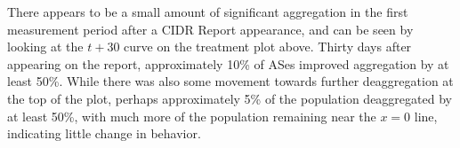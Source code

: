 There appears to be a small amount of significant aggregation in
the first measurement period after a CIDR Report appearance, and can be seen
by looking at the $t+30$ curve on the treatment plot above. Thirty days after
appearing on the report, approximately 10\% of ASes improved aggregation by at
least 50\%. While there was also some movement towards further deaggregation at
the top of the plot, perhaps approximately 5\% of the population deaggregated
by at least 50\%, with much more of the population remaining near the $x=0$
line, indicating little change in behavior.

%
%
%

